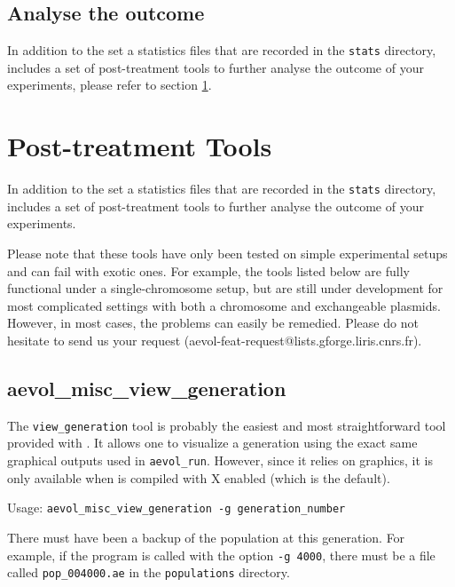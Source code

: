 \subsection{Analyse the outcome}

In addition to the set a statistics files that are recorded in the \verb?stats? directory, \aevol{} includes a set of post-treatment tools to further analyse the outcome of your experiments, please refer to section \ref{sect:post-treatments}.


\section{Post-treatment Tools}
\label{sect:post-treatments}

In addition to the set a statistics files that are recorded in the \verb?stats? directory, \aevol{} includes a set of post-treatment tools to further analyse the outcome of your experiments.

Please note that these tools have only been tested on simple experimental setups and can fail with exotic ones. For example, the tools listed below are fully functional under a single-chromosome setup, but are still under development for most complicated settings with both a chromosome and exchangeable plasmids. However, in most cases, the problems can easily be remedied. Please do not hesitate to send us your request (aevol-feat-request@lists.gforge.liris.cnrs.fr).


\subsection{aevol\_misc\_view\_generation}
\label{sect:view-gener}
The \verb?view_generation? tool is probably the easiest and most straightforward tool provided with \aevol{}.
It allows one to visualize a generation using the exact same graphical outputs used in \verb?aevol_run?.
However, since it relies on graphics, it is only available when \aevol{} is compiled with X enabled (which is the default).

Usage: \verb?aevol_misc_view_generation -g generation_number?

There must have been a backup of the population at this generation. For example, if the program is called with the option
\verb?-g 4000?, there must be a file called \verb?pop_004000.ae? in the \verb?populations? directory.



